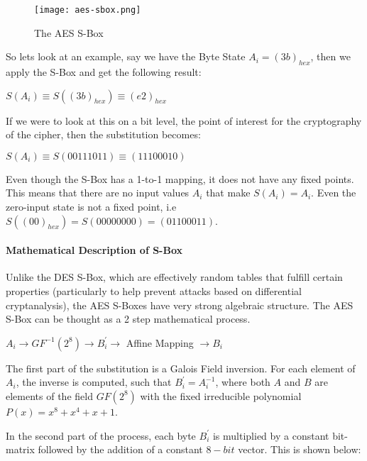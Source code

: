 \begin{figure}[H]
\begin{center}
\texttt{[image: aes-sbox.png]}
\end{center}
\caption{The AES S-Box}
\label{AES-S-BOX}
\end{figure}

So lets look at an example, say we have the Byte State $A_i = (3b)_{hex}$, then we apply the S-Box and get the following result:

\begin{center}
$S(A_i) \equiv S((3b)_{hex}) \equiv (e2)_{hex}$
\end{center}

If we were to look at this on a bit level, the point of interest for the cryptography of the cipher, then the substitution becomes:

\begin{center}
$S(A_i) \equiv S(00111011) \equiv (11100010)$
\end{center}

Even though the S-Box has a 1-to-1 mapping, it does not have any fixed points. This means that there are no input values $A_i$ that make $S(A_i) = A_i$. Even the zero-input state is not a fixed point, i.e $S((00)_{hex}) = S(00000000) = (01100011)$.

\paragraph{Mathematical Description of S-Box}

Unlike the DES S-Box, which are effectively random tables that fulfill certain properties (particularly to help prevent attacks based on differential cryptanalysis), the AES S-Boxes have very strong algebraic structure. The AES S-Box can be thought as a 2 step mathematical process. 

\begin{center}
$A_i \longrightarrow GF^{-1}(2^8) \longrightarrow B^{'}_{i} \longrightarrow$ Affine Mapping $\longrightarrow B_i$
\end{center}

The first part of the substitution is a Galois Field inversion. For each element of $A_i$, the inverse is computed, such that $B^{'}_i = A^{-1}_i$, where both $A$ and $B$ are elements of the field $GF(2^8)$ with the fixed irreducible polynomial $P(x) = x^8 + x^4 + x + 1$. 

In the second part of the process, each byte $B^{'}_i$ is multiplied by a constant bit-matrix followed by the addition of a constant $8-bit$ vector. This is shown below:

